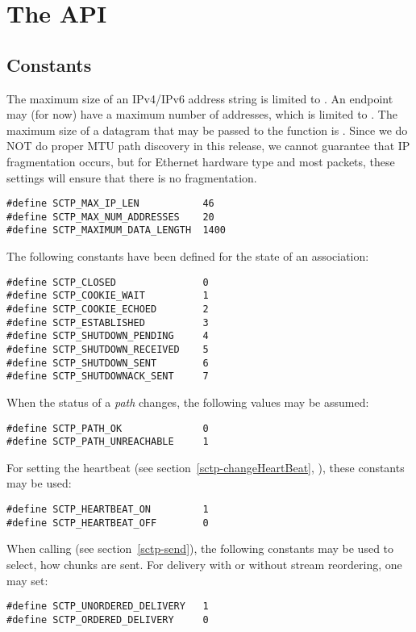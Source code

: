 \documentclass[10pt]{article}
\newcommand{\n}{\normalsize}
\begin{document}
\section{The API}
\subsection{Constants}
The maximum size of an IPv4/IPv6 address string is limited to .
An endpoint may (for now) have a maximum number of addresses, which is limited to
. The maximum size of a datagram that may be passed
to the  function is . Since
we do NOT do proper MTU path discovery in this release, we cannot guarantee that
IP fragmentation occurs, but for Ethernet hardware type and most packets, these
settings will ensure that there is no fragmentation.
\footnotesize
\begin{verbatim}
#define SCTP_MAX_IP_LEN           46
#define SCTP_MAX_NUM_ADDRESSES    20
#define SCTP_MAXIMUM_DATA_LENGTH  1400
\end{verbatim}\n
\noindent
The following constants  have been defined for the state of an association:
\footnotesize
\begin{verbatim}
#define SCTP_CLOSED               0
#define SCTP_COOKIE_WAIT          1
#define SCTP_COOKIE_ECHOED        2
#define SCTP_ESTABLISHED          3
#define SCTP_SHUTDOWN_PENDING     4
#define SCTP_SHUTDOWN_RECEIVED    5
#define SCTP_SHUTDOWN_SENT        6
#define SCTP_SHUTDOWNACK_SENT     7
\end{verbatim}\n
\noindent
When the status of a \emph{path} changes, the following values may be assumed:
\footnotesize
\begin{verbatim}
#define SCTP_PATH_OK              0
#define SCTP_PATH_UNREACHABLE     1
\end{verbatim}\n
\noindent
For setting the heartbeat (see section~\ref{sctp-changeHeartBeat}, ),
these constants may be used:
\footnotesize
\begin{verbatim}
#define SCTP_HEARTBEAT_ON         1
#define SCTP_HEARTBEAT_OFF        0
\end{verbatim}\n
\noindent
When calling  (see section~\ref{sctp-send}), the following
constants may be used to select, how chunks are sent. For delivery with
or without stream reordering, one may set:
\footnotesize
\begin{verbatim}
#define SCTP_UNORDERED_DELIVERY   1
#define SCTP_ORDERED_DELIVERY     0
\end{verbatim}\n
\end{document}
